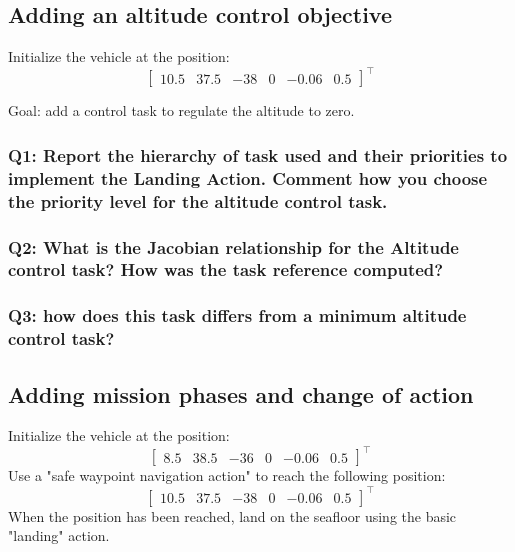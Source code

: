 \documentclass{article}
\begin{document}
\subsection{Adding an altitude control objective}
Initialize the vehicle at the position:
\begin{displaymath}
\begin{bmatrix} 10.5 & 37.5 & -38 & 0 & -0.06 & 0.5 \end{bmatrix}^\top
\end{displaymath}

Goal: add a control task to regulate the altitude to zero.

\subsubsection{Q1: Report the hierarchy of task used and their priorities to implement the Landing Action. Comment how you choose the priority level for the altitude control task.}

\subsubsection{Q2: What is the Jacobian relationship for the Altitude control task? How was the task reference computed?}

\subsubsection{Q3: how does this task differs from a minimum altitude control task?}

\subsection{Adding mission phases and change of action}
Initialize the vehicle at the position:
\begin{displaymath}
\begin{bmatrix} 8.5 & 38.5 & -36 & 0 & -0.06 & 0.5 \end{bmatrix}^\top
\end{displaymath}
Use a "safe waypoint navigation action" to reach the following position:
\begin{displaymath}
\begin{bmatrix} 10.5 & 37.5 & -38 & 0 & -0.06 & 0.5 \end{bmatrix}^\top
\end{displaymath}
When the position has been reached, land on the seafloor using the basic "landing" action.
\end{document}
